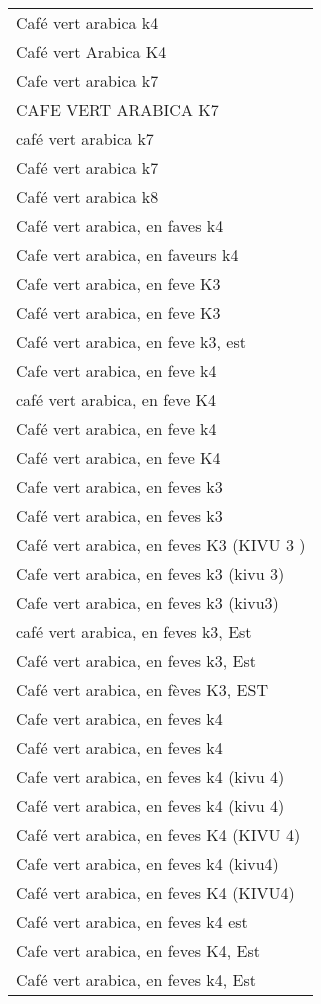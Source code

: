 \documentclass[
]{book}
\begin{document}
\begin{longtable}[t]{l}
Café vert arabica k4\\
Café vert Arabica K4\\
\addlinespace
Cafe vert arabica k7\\
CAFE VERT ARABICA K7\\
café vert arabica k7\\
Café vert arabica k7\\
Café vert arabica k8\\
\addlinespace
Café vert arabica, en faves k4\\
Cafe vert arabica, en faveurs k4\\
Cafe vert arabica, en feve K3\\
Café vert arabica, en feve K3\\
Café vert arabica, en feve k3, est\\
\addlinespace
Cafe vert arabica, en feve k4\\
café vert arabica, en feve K4\\
Café vert arabica, en feve k4\\
Café vert arabica, en feve K4\\
Cafe vert arabica, en feves k3\\
\addlinespace
Café vert arabica, en feves k3\\
Café vert arabica, en feves K3 (KIVU 3 )\\
Cafe vert arabica, en feves k3 (kivu 3)\\
Cafe vert arabica, en feves k3 (kivu3)\\
café vert arabica, en feves k3, Est\\
\addlinespace
Café vert arabica, en feves k3, Est\\
Café vert arabica, en fèves K3, EST\\
Cafe vert arabica, en feves k4\\
Café vert arabica, en feves k4\\
Cafe vert arabica, en feves k4 (kivu 4)\\
\addlinespace
Café vert arabica, en feves k4 (kivu 4)\\
Café vert arabica, en feves K4 (KIVU 4)\\
Cafe vert arabica, en feves k4 (kivu4)\\
Café vert arabica, en feves K4 (KIVU4)\\
Café vert arabica, en feves k4 est\\
\addlinespace
Cafe vert arabica, en feves K4, Est\\
Café vert arabica, en feves k4, Est\\

\end{longtable}
\end{document}
